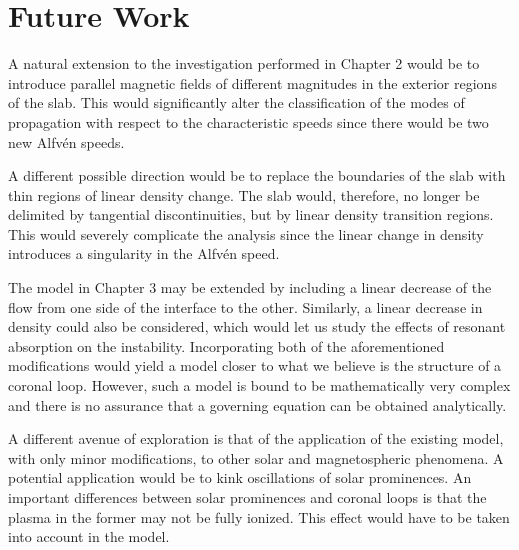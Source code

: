 \documentclass[12pt]{ociamthesis}
\begin{document}
\section{Future Work}

A natural extension to the investigation performed in Chapter 2 would be to introduce parallel magnetic fields of different magnitudes in the exterior regions of the slab.
This would significantly alter the classification of the modes of propagation with respect to the characteristic speeds since there would be two new Alfv\'en speeds.

A different possible direction would be to replace the boundaries of the slab with thin regions of linear density change.
The slab would, therefore, no longer be delimited by tangential discontinuities, but by linear density transition regions.
This would severely complicate the analysis since the linear change in density introduces a singularity in the Alfv\'en speed.

The model in Chapter 3 may be extended by including a linear decrease of the flow from one side of the interface to the other.
Similarly, a linear decrease in density could also be considered, which would let us study the effects of resonant absorption on the instability.
Incorporating both of the aforementioned modifications would yield a model closer to what we believe is the structure of a coronal loop.
However, such a model is bound to be mathematically very complex and there is no assurance that a governing equation can be obtained analytically.

A different avenue of exploration is that of the application of the existing model, with only minor modifications, to other solar and magnetospheric phenomena.
A potential application would be to kink oscillations of solar prominences.
An important differences between solar prominences and coronal loops is that the plasma in the former may not be fully ionized.
This effect would have to be taken into account in the model.




  
\end{document}
